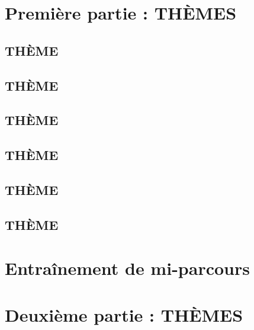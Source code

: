 \documentclass[poly,trombi]{valbonne}
\begin{document}
\minitoc \clearpage

\section{Première partie : THÈMES}

\subsection{THÈME}


\subsection{THÈME}


\subsection{THÈME}


\subsection{THÈME}


\subsection{THÈME}


\subsection{THÈME}





\section{Entraînement de mi-parcours}


\section{Deuxième partie : THÈMES}
\end{document}

